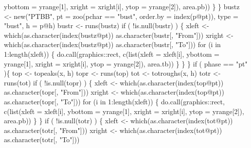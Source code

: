 \documentclass[a4paper]{article}
\begin{document}
                                                       ybottom = yrange[1],
                                                       xright = xright[i],
                                                       ytop = yrange[2]),
                                                  area.pb))
                    \}
                \}
                bustz <- new("PTBB",
                             pt = zoo(pchar == "bust",
                                      order.by = index(p@pt)),
                              type = "bust",
                             h = p@h)
                bustr <- runs(bustz)
                if ( !is.null(bustr) ) \{
                    xleft <- which(as.character(index(bustz@pt)) %
                                   as.character(bustr[, "From"]))
                    xright <- which(as.character(index(bustz@pt)) %
                                    as.character(bustr[, "To"]))
                    for (i in 1:length(xleft)) \{
                        do.call(graphics::rect, c(list(xleft = xleft[i],
                                                       ybottom = yrange[1],
                                                       xright = xright[i],
                                                       ytop = yrange[2]),
                                                  area.tb))
                    \}
                \}
            \}
            if ( phase == "pt" )\{
                top <- topeaks(x, h)
                topr <- runs(top)
                tot <- totroughs(x, h)
                totr <- runs(tot)
                if ( !is.null(topr) ) \{
                    xleft <- which(as.character(index(top@pt)) %
                                   as.character(topr[, "From"]))
                    xright <- which(as.character(index(top@pt)) %
                                    as.character(topr[, "To"]))
                    for (i in 1:length(xleft)) \{
                        do.call(graphics::rect, c(list(xleft = xleft[i],
                                                       ybottom = yrange[1],
                                                       xright = xright[i],
                                                       ytop = yrange[2]),
                                                  area.pb))
                    \}
                \}
                if ( !is.null(totr) ) \{
                    xleft <- which(as.character(index(tot@pt)) %
                                   as.character(totr[, "From"]))
                    xright <- which(as.character(index(tot@pt)) %
                                    as.character(totr[, "To"]))
\end{document}
